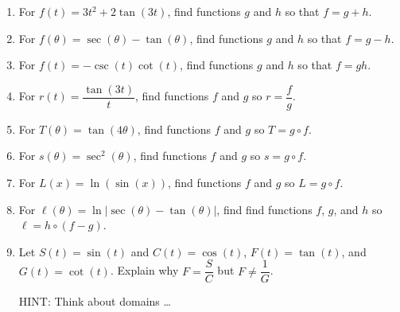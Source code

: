 \documentclass{ximera}
\begin{document}
\begin{enumerate}
\setcounter{enumi}{\value{HW}}

\item  For $f(t) = 3t^2 + 2 \tan(3t)$, find functions $g$ and $h$ so that $f=g+h$. \label{decomposebasicothercircularfirst}

\item  For $f(\theta) = \sec(\theta) - \tan(\theta)$, find functions $g$ and $h$ so that $f=g-h$. 

\item  For $f(t) = -\csc(t) \cot(t)$, find functions $g$ and $h$ so that $f=gh$.

\item  For $r(t) = \dfrac{\tan(3t)}{t}$, find functions $f$ and $g$ so $r = \dfrac{f}{g}$.

\item  For $T(\theta) =\tan(4 \theta)$, find functions $f$ and $g$ so $T = g \circ f$.

\item  For $s(\theta) = \sec^{2}(\theta)$, find functions $f$ and $g$ so $s = g \circ f$.

\item  For $L(x) = \ln (\sin(x) )$, find functions $f$ and $g$ so $L = g \circ f$.       

\item  For $\ell(\theta) = \ln | \sec(\theta) - \tan(\theta)|$, find  find functions $f$,  $g$, and $h$ so $\ell = h \circ (f-g)$.\label{decomposebasicothercircularlast}

\item  Let $S(t) = \sin(t)$ and $C(t) = \cos(t)$, $F(t) = \tan(t)$, and $G(t) = \cot(t)$.  Explain why $F = \dfrac{S}{C}$ but $F \neq \dfrac{1}{G}$.

HINT: Think about domains \ldots

\setcounter{HW}{\value{enumi}}
\end{enumerate}


\newpage
\end{document}
